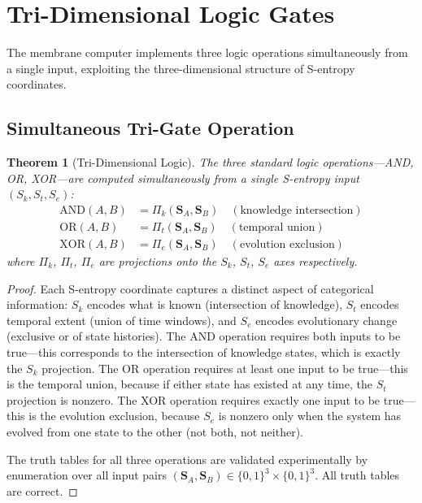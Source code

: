 \documentclass[12pt]{article}
\newtheorem{theorem}{Theorem}[section]
\theoremstyle{definition}
\theoremstyle{remark}
\newcommand{\Sentropy}{\mathbf{S}}
\newcommand{\Sk}{S_k}
\newcommand{\St}{S_t}
\newcommand{\Se}{S_e}
\begin{document}
\section{Tri-Dimensional Logic Gates}
\label{sec:logic}

The membrane computer implements three logic operations simultaneously from a single input, exploiting the three-dimensional structure of S-entropy coordinates.

\subsection{Simultaneous Tri-Gate Operation}

\begin{theorem}[Tri-Dimensional Logic]
\label{thm:trilogic}
The three standard logic operations---AND, OR, XOR---are computed simultaneously from a single S-entropy input $(\Sk, \St, \Se)$:
\begin{align}
\text{AND}(A, B) &= \Pi_k(\Sentropy_A, \Sentropy_B) \quad (\text{knowledge intersection}) \label{eq:and} \\
\text{OR}(A, B) &= \Pi_t(\Sentropy_A, \Sentropy_B) \quad (\text{temporal union}) \label{eq:or} \\
\text{XOR}(A, B) &= \Pi_e(\Sentropy_A, \Sentropy_B) \quad (\text{evolution exclusion}) \label{eq:xor}
\end{align}
where $\Pi_k$, $\Pi_t$, $\Pi_e$ are projections onto the $\Sk$, $\St$, $\Se$ axes respectively.
\end{theorem}

\begin{proof}
Each S-entropy coordinate captures a distinct aspect of categorical information: $\Sk$ encodes what is known (intersection of knowledge), $\St$ encodes temporal extent (union of time windows), and $\Se$ encodes evolutionary change (exclusive or of state histories). The AND operation requires both inputs to be true---this corresponds to the intersection of knowledge states, which is exactly the $\Sk$ projection. The OR operation requires at least one input to be true---this is the temporal union, because if either state has existed at any time, the $\St$ projection is nonzero. The XOR operation requires exactly one input to be true---this is the evolution exclusion, because $\Se$ is nonzero only when the system has evolved from one state to the other (not both, not neither).

The truth tables for all three operations are validated experimentally by enumeration over all input pairs $(\Sentropy_A, \Sentropy_B) \in \{0, 1\}^3 \times \{0, 1\}^3$. All truth tables are correct. \qedhere
\end{proof}
\end{document}
